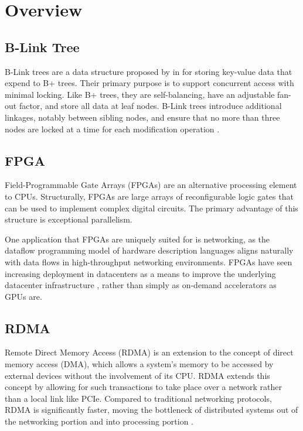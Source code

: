 \section{Overview}

\subsection{B-Link Tree}

B-Link trees are a data structure proposed by \citeauthor{b-link} in \citeyear{b-link} for storing key-value data that expend to B+ trees. Their primary purpose is to support concurrent access with minimal locking. Like B+ trees, they are self-balancing, have an adjustable fan-out factor, and store all data at leaf nodes. B-Link trees introduce additional linkages, notably between sibling nodes, and ensure that no more than three nodes are locked at a time for each modification operation \cite{b-link}.


\subsection{FPGA}

Field-Programmable Gate Arrays (FPGAs) are an alternative processing element to CPUs. Structurally, FPGAs are large arrays of reconfigurable logic gates that can be used to implement complex digital circuits. The primary advantage of this structure is exceptional parallelism.

One application that FPGAs are uniquely suited for is networking, as the dataflow programming model of hardware description languages aligns naturally with data flows in high-throughput networking environments. FPGAs have seen increasing deployment in datacenters as a means to improve the underlying datacenter infrastructure \cite{bobda-trets-2022,fang-vldb-2020}, rather than simply as on-demand accelerators as GPUs are.


\subsection{RDMA}

Remote Direct Memory Access (RDMA) is an extension to the concept of direct memory access (DMA), which allows a system's memory to be accessed by external devices without the involvement of its CPU. RDMA extends this concept by allowing for such transactions to take place over a network rather than a local link like PCIe. Compared to traditional networking protocols, RDMA is significantly faster, moving the bottleneck of distributed systems out of the networking portion and into processing portion \cite{binnig-vldb-2016}.

